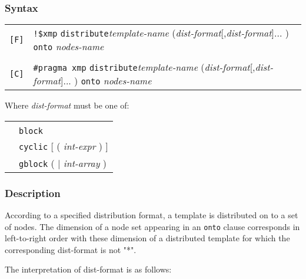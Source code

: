 \subsubsection*{Syntax}

\begin{tabular}{ll}
\verb![F]! & \verb|!$xmp| {\tt distribute}{\it template-name} 
({\it dist-format}[,{\it dist-format}]... ) {\tt onto} {\it nodes-name} \\
& \\
\verb![C]! & \verb|#pragma xmp| {\tt distribute}{\it template-name} 
({\it dist-format}[,{\it dist-format}]... ) {\tt onto} {\it nodes-name} \\
\end{tabular}
\vspace{0.3cm}

Where {\it dist-format} must be one of:

\begin{tabular}{ll}
 \hspace{0.5cm} & {\tt *} \\
 & {\tt block} \\
 & {\tt cyclic} [ ( {\it int-expr} ) ] \\
 & {\tt gblock} ( {\tt *} $\vert$ {\it int-array} ) \\
\end{tabular}

\subsubsection*{Description}

According to a specified
distribution format, a template is distributed on to a set of nodes. The
dimension of a node set appearing in an {\tt onto} clause corresponds in
left-to-right order with these dimension of a distributed template for
which the corresponding dist-format is not "*". 

The interpretation of dist-format is as follows:

